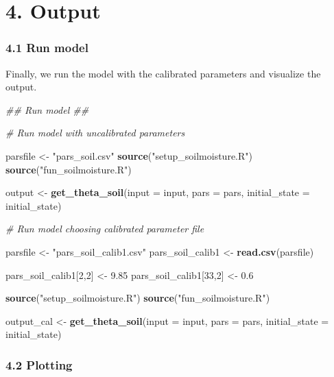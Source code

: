 \documentclass[
]{article}
\newenvironment{Shaded}{\begin{snugshade}}{\end{snugshade}}
\newcommand{\CommentTok}[1]{\textcolor[rgb]{0.56,0.35,0.01}{\textit{#1}}}
\newcommand{\DataTypeTok}[1]{\textcolor[rgb]{0.13,0.29,0.53}{#1}}
\newcommand{\DecValTok}[1]{\textcolor[rgb]{0.00,0.00,0.81}{#1}}
\newcommand{\FloatTok}[1]{\textcolor[rgb]{0.00,0.00,0.81}{#1}}
\newcommand{\KeywordTok}[1]{\textcolor[rgb]{0.13,0.29,0.53}{\textbf{#1}}}
\newcommand{\NormalTok}[1]{#1}
\newcommand{\StringTok}[1]{\textcolor[rgb]{0.31,0.60,0.02}{#1}}
\begin{document}
\hypertarget{output}{%
\section{4. Output}\label{output}}

\hypertarget{run-model}{%
\subsubsection{4.1 Run model}\label{run-model}}

Finally, we run the model with the calibrated parameters and visualize
the output.

\begin{Shaded}
\begin{Highlighting}[]
\CommentTok{## Run model ##}


\CommentTok{# Run model with uncalibrated parameters}

\NormalTok{parsfile <-}\StringTok{ "pars_soil.csv"}
\KeywordTok{source}\NormalTok{(}\StringTok{"setup_soilmoisture.R"}\NormalTok{)}
\KeywordTok{source}\NormalTok{(}\StringTok{"fun_soilmoisture.R"}\NormalTok{)}

\NormalTok{output <-}\StringTok{ }\KeywordTok{get_theta_soil}\NormalTok{(}\DataTypeTok{input =}\NormalTok{ input, }\DataTypeTok{pars =}\NormalTok{ pars, }\DataTypeTok{initial_state =}\NormalTok{ initial_state)}


\CommentTok{# Run model choosing calibrated parameter file}

\NormalTok{parsfile <-}\StringTok{ "pars_soil_calib1.csv"}
\NormalTok{pars_soil_calib1 <-}\StringTok{ }\KeywordTok{read.csv}\NormalTok{(parsfile)}

\NormalTok{pars_soil_calib1[}\DecValTok{2}\NormalTok{,}\DecValTok{2}\NormalTok{] <-}\StringTok{ }\FloatTok{9.85}
\NormalTok{pars_soil_calib1[}\DecValTok{33}\NormalTok{,}\DecValTok{2}\NormalTok{] <-}\StringTok{ }\FloatTok{0.6}


\KeywordTok{source}\NormalTok{(}\StringTok{"setup_soilmoisture.R"}\NormalTok{)}
\KeywordTok{source}\NormalTok{(}\StringTok{"fun_soilmoisture.R"}\NormalTok{)}

\NormalTok{output_cal <-}\StringTok{ }\KeywordTok{get_theta_soil}\NormalTok{(}\DataTypeTok{input =}\NormalTok{ input, }\DataTypeTok{pars =}\NormalTok{ pars, }\DataTypeTok{initial_state =}\NormalTok{ initial_state)}
\end{Highlighting}
\end{Shaded}

\hypertarget{plotting}{%
\subsubsection{4.2 Plotting}\label{plotting}}
\end{document}
